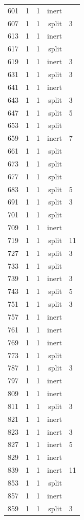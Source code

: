 \begin{longtable}{rrrrl}
601 & 1 & 1 & inert &  \\
607 & 1 & 1 & split & 3 \\
613 & 1 & 1 & inert &  \\
617 & 1 & 1 & split &  \\
619 & 1 & 1 & inert & 3 \\
631 & 1 & 1 & split & 3 \\
641 & 1 & 1 & inert &  \\
643 & 1 & 1 & split & 3 \\
647 & 1 & 1 & split & 5 \\
653 & 1 & 1 & split &  \\
659 & 1 & 1 & inert & 7 \\
661 & 1 & 1 & split &  \\
673 & 1 & 1 & split &  \\
677 & 1 & 1 & split &  \\
683 & 1 & 1 & split & 5 \\
691 & 1 & 1 & split & 3 \\
701 & 1 & 1 & split &  \\
709 & 1 & 1 & inert &  \\
719 & 1 & 1 & split & 11 \\
727 & 1 & 1 & split & 3 \\
733 & 1 & 1 & split &  \\
739 & 1 & 1 & inert & 3 \\
743 & 1 & 1 & split & 5 \\
751 & 1 & 1 & split & 3 \\
757 & 1 & 1 & inert &  \\
761 & 1 & 1 & inert &  \\
769 & 1 & 1 & inert &  \\
773 & 1 & 1 & split &  \\
787 & 1 & 1 & split & 3 \\
797 & 1 & 1 & inert &  \\
809 & 1 & 1 & inert &  \\
811 & 1 & 1 & split & 3 \\
821 & 1 & 1 & inert &  \\
823 & 1 & 1 & inert & 3 \\
827 & 1 & 1 & inert & 5 \\
829 & 1 & 1 & inert &  \\
839 & 1 & 1 & inert & 11 \\
853 & 1 & 1 & split &  \\
857 & 1 & 1 & inert &  \\
859 & 1 & 1 & split & 3 \\

\end{longtable}

